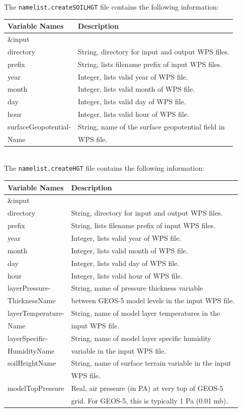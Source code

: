 \newpage

The \texttt{namelist.createSOILHGT} file contains the following information:

\begin{tabular}{|l|l|} \hline
Variable Names & Description \\ \hline
\&input          & \\ \hline
directory & String, directory for input and output WPS files. \\ \hline
prefix & String, lists filename prefix of input WPS files. \\ \hline
year & Integer, lists valid year of WPS file. \\ \hline
month & Integer, lists valid month of WPS file. \\ \hline
day & Integer, lists valid day of WPS file. \\ \hline
hour & Integer, lists valid hour of WPS file. \\ \hline
surfaceGeopotential- & String, name of the  surface geopotential field in  \\
Name & WPS file. \\ \hline
\end{tabular} \\

The \texttt{namelist.createHGT} file contains the following information:

\begin{tabular}{|l|l|} \hline
Variable Names & Description \\ \hline
\&input          & \\ \hline
directory & String, directory for input and output WPS files.\\ \hline
prefix & String, lists filename prefix of input WPS files. \\ \hline
year & Integer, lists valid year of WPS file. \\ \hline
month & Integer, lists valid month of WPS file. \\ \hline
day & Integer, lists valid day of WPS file. \\ \hline
hour & Integer, lists valid hour of WPS file. \\ \hline
layerPressure- & String, name of pressure thickness variable \\
ThicknessName & between GEOS-5 model levels in the input WPS file. \\ \hline
layerTemperature- & String, name of model layer temperatures in the \\
Name & input WPS file. \\ \hline
layerSpecific- & String, name of model layer specific humidity \\
HumidityName  & variable in the input WPS file. \\ \hline
soilHeightName & String, name of surface terrain variable in the input \\
 & WPS file. \\ \hline
modelTopPressure & Real, air pressure (in PA) at very top of GEOS-5 \\
 & grid. For GEOS-5, this is typically 1 Pa (0.01 mb). \\ \hline
\end{tabular} \\

